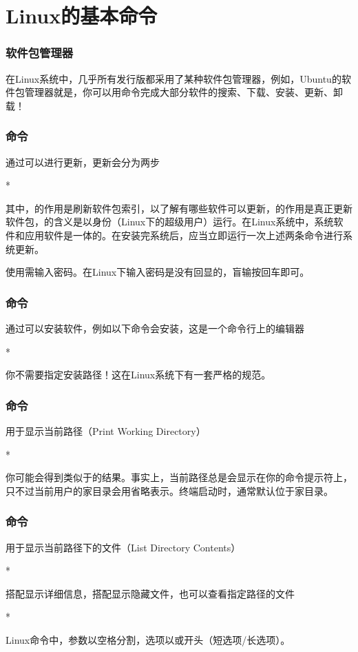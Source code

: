 \section{Linux的基本命令}

\begin{frame}
    \frametitle{软件包管理器}
    在Linux系统中，几乎所有发行版都采用了某种软件包管理器，例如，Ubuntu的软件包管理器就是，你可以用命令完成大部分软件的搜索、下载、安装、更新、卸载！
\end{frame}

\begin{frame}
    \frametitle{命令}
    通过可以进行更新，更新会分为两步
    \begin{Code}*
        
    \end{Code}
    其中，的作用是刷新软件包索引，以了解有哪些软件可以更新，的作用是真正更新软件包，的含义是以身份（Linux下的超级用户）运行。在Linux系统中，系统软件和应用软件是一体的。在安装完系统后，应当立即运行一次上述两条命令进行系统更新。

    使用需输入密码。在Linux下输入密码是没有回显的，盲输按回车即可。
\end{frame}

\begin{frame}
    \frametitle{命令}
    通过可以安装软件，例如以下命令会安装，这是一个命令行上的编辑器
    \begin{Code}*
        
    \end{Code}
    你不需要指定安装路径！这在Linux系统下有一套严格的规范。
\end{frame}

\begin{frame}
    \frametitle{命令}
    用于显示当前路径（Print Working Directory）
    \begin{Code}*
        
    \end{Code}
    你可能会得到类似于的结果。事实上，当前路径总是会显示在你的命令提示符上，只不过当前用户的家目录会用\code{\~}省略表示。终端启动时，通常默认位于家目录。
\end{frame}

\begin{frame}
    \frametitle{命令}
    用于显示当前路径下的文件（List Directory Contents）
    \begin{Code}*
        
    \end{Code}
    搭配显示详细信息，搭配显示隐藏文件，也可以查看指定路径的文件
    \begin{Code}*
        
    \end{Code}
    Linux命令中，参数以空格分割，选项以\code{-}或\code{--}开头（短选项/长选项）。
\end{frame}

